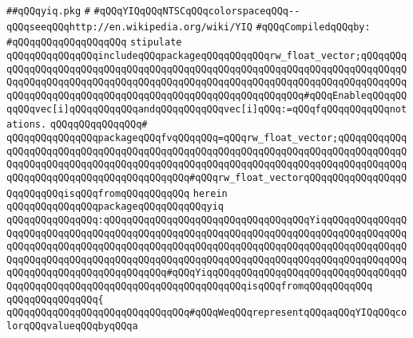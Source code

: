 \label{src/lib/x-kit/xclient/src/color/yiq.pkg}
\verb|##qQQqyiq.pkg|\newline
\verb|#|\newline
\verb|#qQQqYIQqQQqNTSCqQQqcolorspaceqQQq--qQQqseeqQQqhttp://en.wikipedia.org/wiki/YIQ|\newline
\newline
\verb|#qQQqCompiledqQQqby:|\newline
\verb|#qQQqqQQqqQQqqQQqqQQq|\newline
\newline
\newline
\verb|stipulate|\newline
\verb|qQQqqQQqqQQqqQQqincludeqQQqpackageqQQqqQQqqQQqrw_float_vector;qQQqqQQqqQQqqQQqqQQqqQQqqQQqqQQqqQQqqQQqqQQqqQQqqQQqqQQqqQQqqQQqqQQqqQQqqQQqqQQqqQQqqQQqqQQqqQQqqQQqqQQqqQQqqQQqqQQqqQQqqQQqqQQqqQQqqQQqqQQqqQQqqQQqqQQqqQQqqQQqqQQqqQQqqQQqqQQqqQQqqQQqqQQqqQQqqQQqqQQq#qQQqEnableqQQqqQQqqQQqvec[i]qQQqqQQqqQQqandqQQqqQQqqQQqvec[i]qQQq:=qQQqfqQQqqQQqqQQqnotations.|\newline
\verb|qQQqqQQqqQQqqQQq#|\newline
\verb|qQQqqQQqqQQqqQQqpackageqQQqfvqQQqqQQq=qQQqrw_float_vector;qQQqqQQqqQQqqQQqqQQqqQQqqQQqqQQqqQQqqQQqqQQqqQQqqQQqqQQqqQQqqQQqqQQqqQQqqQQqqQQqqQQqqQQqqQQqqQQqqQQqqQQqqQQqqQQqqQQqqQQqqQQqqQQqqQQqqQQqqQQqqQQqqQQqqQQqqQQqqQQqqQQqqQQqqQQqqQQqqQQqqQQq#qQQqrw_float_vectorqQQqqQQqqQQqqQQqqQQqqQQqqQQqisqQQqfromqQQqqQQqqQQq|\newline
\verb|herein|\newline
\newline
\verb|qQQqqQQqqQQqqQQqpackageqQQqqQQqqQQqyiq|\newline
\verb|qQQqqQQqqQQqqQQq:qQQqqQQqqQQqqQQqqQQqqQQqqQQqqQQqqQQqYiqqQQqqQQqqQQqqQQqqQQqqQQqqQQqqQQqqQQqqQQqqQQqqQQqqQQqqQQqqQQqqQQqqQQqqQQqqQQqqQQqqQQqqQQqqQQqqQQqqQQqqQQqqQQqqQQqqQQqqQQqqQQqqQQqqQQqqQQqqQQqqQQqqQQqqQQqqQQqqQQqqQQqqQQqqQQqqQQqqQQqqQQqqQQqqQQqqQQqqQQqqQQqqQQqqQQqqQQqqQQqqQQqqQQqqQQqqQQqqQQqqQQqqQQqqQQq#qQQqYiqqQQqqQQqqQQqqQQqqQQqqQQqqQQqqQQqqQQqqQQqqQQqqQQqqQQqqQQqqQQqqQQqqQQqqQQqqQQqisqQQqfromqQQqqQQqqQQq|\newline
\verb|qQQqqQQqqQQqqQQq{|\newline
\verb|qQQqqQQqqQQqqQQqqQQqqQQqqQQqqQQq#qQQqWeqQQqrepresentqQQqaqQQqYIQqQQqcolorqQQqvalueqQQqbyqQQqa|\newline
